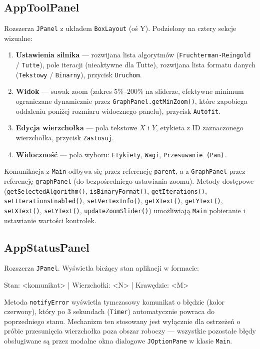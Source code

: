 \documentclass[a4paper, 11pt]{article}
\begin{document}
\subsection{AppToolPanel}

Rozszerza \texttt{JPanel} z układem \texttt{BoxLayout} (oś Y).
Podzielony na cztery sekcje wizualne:

\begin{enumerate}
  \item \textbf{Ustawienia silnika} --- rozwijana lista algorytmów
    (\texttt{Fruchterman-Reingold} / \texttt{Tutte}), pole iteracji
    (nieaktywne dla Tutte), rozwijana lista formatu danych
    (\texttt{Tekstowy} / \texttt{Binarny}), przycisk \texttt{Uruchom}.
  \item \textbf{Widok} --- suwak zoom (zakres $5\%$--$200\%$ na sliderze,
    efektywne minimum ograniczane dynamicznie przez \texttt{GraphPanel.getMinZoom()},
    które zapobiega oddaleniu poniżej rozmiaru widocznego panelu),
    przycisk \texttt{Autofit}.
  \item \textbf{Edycja wierzchołka} --- pola tekstowe $X$ i $Y$,
    etykieta z ID zaznaczonego wierzchołka, przycisk \texttt{Zastosuj}.
  \item \textbf{Widoczność} --- pola wyboru: \texttt{Etykiety},
    \texttt{Wagi}, \texttt{Przesuwanie (Pan)}.
\end{enumerate}

Komunikacja z \texttt{Main} odbywa się przez referencję \texttt{parent},
a z \texttt{GraphPanel} przez referencję \texttt{graphPanel} (do
bezpośredniego ustawiania zoomu). Metody dostępowe
(\texttt{getSelectedAlgorithm()}, \texttt{isBinaryFormat()},
\texttt{getIterations()}, \texttt{setIterationsEnabled()},
\texttt{setVertexInfo()},
\texttt{getXText()}, \texttt{getYText()},
\texttt{setXText()}, \texttt{setYText()},
\texttt{updateZoomSlider()}) umożliwiają \texttt{Main}
pobieranie i ustawianie wartości kontrolek.

\subsection{AppStatusPanel}

Rozszerza \texttt{JPanel}. Wyświetla bieżący stan aplikacji w formacie:

\begin{filebox}
Stan: <komunikat> | Wierzchołki: <N> | Krawędzie: <M>
\end{filebox}

Metoda \texttt{notifyError} wyświetla tymczasowy komunikat o błędzie
(kolor czerwony), który po 3 sekundach (\texttt{Timer}) automatycznie
powraca do poprzedniego stanu. Mechanizm ten stosowany jest wyłącznie
dla ostrzeżeń o próbie przesunięcia wierzchołka poza obszar roboczy ---
wszystkie pozostałe błędy obsługiwane są przez modalne okna dialogowe
\texttt{JOptionPane} w klasie \texttt{Main}.
\end{document}

